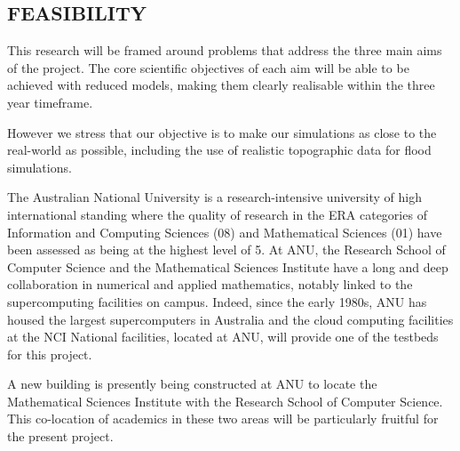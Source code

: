 \iffalse
\subsection*{RESEARCH ENVIRONMENT}
\fi

\subsection*{FEASIBILITY}

\iffalse The project is feasible due to the rigorous design with distinct tasks
and timelines which address the identified, well understood challenges
in this discipline. 
\fi

\iffalse
The project brings together a multi-disciplinary
team of experts in mathematics, software engineering, human computer interaction and high
performance computing.
\fi

This research will be framed around problems that address the three main aims of the project. The core scientific objectives of each aim will be able to be achieved with reduced models, making them clearly realisable within the three year timeframe.







 However we stress that our objective is to make our simulations as close to the real-world as possible, including the use of realistic topographic data for flood simulations.




The Australian National University is a research-intensive university
of high international standing where the quality of research in the ERA categories of 
 Information and Computing
Sciences (08) and Mathematical Sciences (01) have been assessed as
being at the highest level of 5. At ANU, the Research School of
Computer Science and the Mathematical Sciences Institute have a long
and deep collaboration in numerical and applied mathematics, notably  linked to the supercomputing
facilities on campus. Indeed, since the early 1980s, ANU has housed the
largest supercomputers in Australia and the cloud computing facilities at the NCI National
facilities, located at ANU, will provide one of the testbeds for this
project.

A new building is presently being constructed at ANU to
locate the Mathematical Sciences Institute with the Research
School of Computer Science. This co-location of academics in these two
areas will be particularly fruitful for the present project.
